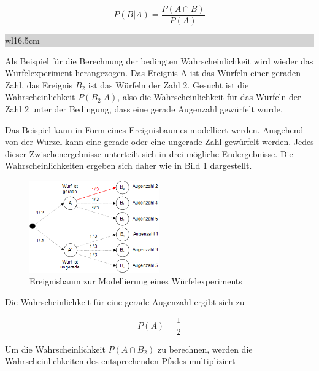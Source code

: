 \begin{equation}\label{eq:twofiftyfour}
P(B|A)=\dfrac{P(A\cap B)}{P(A)}
\end{equation}

\noindent
\colorbox{lightgray}{%
%
\renewcommand\arraystretch{0.6}%
\begin{tabular}{ wl{16.5cm} }
{\selectfont
{}}
\end{tabular}%
}\bigskip

\noindent Als Beispiel f\"{u}r die Berechnung der bedingten Wahrscheinlichkeit wird wieder das W\"{u}rfelexperiment herangezogen. Das Ereignis A ist das W\"{u}rfeln einer geraden Zahl, das Ereignis $B_{2}$ ist das W\"{u}rfeln der Zahl 2. Gesucht ist die Wahrscheinlichkeit $P(B_{2}|A)$, also die Wahrscheinlichkeit f\"{u}r das W\"{u}rfeln der Zahl 2 unter der Bedingung, dass eine gerade Augenzahl gew\"{u}rfelt wurde.

\noindent Das Beispiel kann in Form eines Ereignisbaumes modelliert werden. Ausgehend von der Wurzel kann eine gerade oder eine ungerade Zahl gew\"{u}rfelt werden. Jedes dieser Zwischenergebnisse unterteilt sich in drei m\"{o}gliche Endergebnisse. Die Wahrscheinlichkeiten ergeben sich daher wie in Bild \ref{fig:Wuerfeln} dargestellt.

\noindent 
\begin{figure}[H]
  \centerline{\includegraphics[width=0.5\textwidth]{Kapitel2/Bilder/image11}}
  \caption{Ereignisbaum zur Modellierung eines W\"{u}rfelexperiments}
  \label{fig:Wuerfeln}
\end{figure}

\noindent Die Wahrscheinlichkeit f\"{u}r eine gerade Augenzahl ergibt sich zu

\begin{equation}\label{eq:twofiftyfive}
P(A)=\dfrac{1}{2}
\end{equation}

\noindent Um die Wahrscheinlichkeit $P(A\cap B_{2})$ zu berechnen, werden die Wahrscheinlichkeiten des entsprechenden Pfades multipliziert

